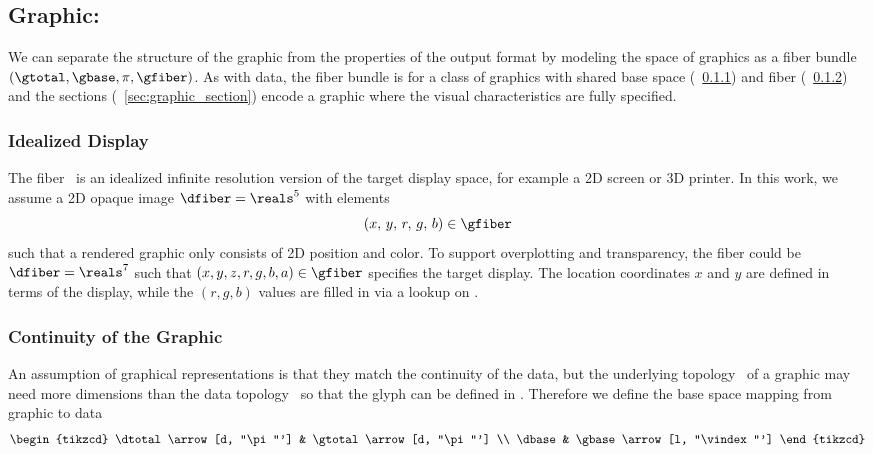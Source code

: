\documentclass[../main.tex]{subfiles}
\begin{document}
\subsection{Graphic: \gtotal}
\label{sec:graphic}  
We can separate the structure of the graphic from the properties of the output format by modeling the space of graphics as a fiber bundle  $(\gtotal, \gbase, \pi, \gfiber)$. As with data, the fiber bundle is for a class of graphics with shared base space \gbase (~\ref{sec:graphic_fiber}) and fiber \gfiber (~\ref{sec:graphic_base}) and the sections \gsection (~\ref{sec:graphic_section}) encode a graphic where the visual characteristics are fully specified.

\subsubsection{Idealized Display \gfiber}
\label{sec:graphic_fiber}
The fiber \gfiber\ is an idealized infinite resolution version of the target display space, for example a 2D screen or 3D printer. In this work, we assume a 2D opaque image $\dfiber=\reals^5$ with elements 
\begin{equation}
(x,\, y,\, r,\, g,\, b) \in \gfiber
\end{equation}
such that a rendered graphic only consists of 2D position and color. To support overplotting and transparency, the fiber could be $\dfiber=\reals^{7}$ such that $(x, y, z, r, g, b, a) \in \gfiber$ specifies the target display. The location coordinates $x$ and $y$ are defined in terms of the display, while the $(r,g,b)$ values are filled in via a lookup on \gbase. 

\subsubsection{Continuity of the Graphic \gbase} 
\label{sec:graphic_base}
An assumption of graphical representations is that they match the continuity of the data\cite{tufteVisualDisplayQuantitative2001,friendlyBriefHistoryData2008}, but the underlying topology \gbase\ of a graphic may need more dimensions than the data topology \dbase\ so that the glyph can be defined in \dfiber. Therefore we define the base space mapping from graphic \gbase to data \dbase 
\begin{equation}
    \begin{tikzcd}
        \dtotal \arrow[d, "\pi"'] & \gtotal \arrow[d, "\pi"'] \\
        \dbase                   & \gbase \arrow[l, "\vindex"']
        \end{tikzcd}
\end{equation}
\end{document}
